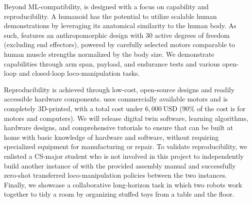 Beyond ML-compatibility, \system is designed with a focus on capability and reproducibility. A humanoid has the potential to utilize scalable human demonstrations by leveraging its anatomical similarity to the human body. As such, \system features an anthropomorphic design with 30 active degrees of freedom (excluding end effectors), powered by carefully selected motors comparable to human muscle strengths normalized by the body size. We demonstrate \systems capabilities through arm span, payload, and endurance tests and various open-loop and closed-loop loco-manipulation tasks.

Reproducibility is achieved through low-cost, open-source designs and readily accessible hardware components. \system uses commercially available motors and is completely 3D-printed, with a total cost under $6,000~\mathrm{USD}$ ($90\%$ of the cost is for motors and computers).  We will release digital twin software, learning algorithms, hardware designs, and comprehensive tutorials to ensure that \system can be built at home with basic knowledge of hardware and software, without requiring specialized equipment for manufacturing or repair. To validate reproducibility, we enlisted a CS-major student who is not involved in this project to independently build another instance of \system with the provided assembly manual and successfully zero-shot transferred loco-manipulation policies between the two instances. Finally, we showcase a collaborative long-horizon task in which two \system robots work together to tidy a room by organizing stuffed toys from a table and the floor.




 


